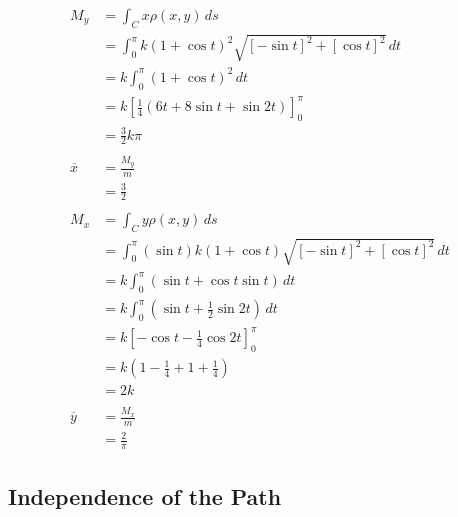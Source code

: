\documentclass{article}
\begin{document}
\setcounter{subsubsection}{40}
\subsubsection{}

\begin{align*}
  M_y          & = \int_C x \rho(x, y) \,ds                                                \\
               & = \int_0^\pi k (1 + \cos t)^2 \sqrt{[-\sin t]^2 + [\cos t]^2} \,dt        \\
               & = k \int_0^\pi (1 + \cos t)^2 \,dt                                        \\
               & = k \left[ \frac{1}{4} (6 t + 8 \sin t + \sin 2 t) \right]_0^\pi          \\
               & = \frac{3}{2} k \pi                                                       \\ \\
  \overline{x} & = \frac{M_y}{m}                                                           \\
               & = \frac{3}{2}                                                             \\ \\
  M_x          & = \int_C y \rho(x, y) \,ds                                                \\
               & = \int_0^\pi (\sin t) k (1 + \cos t) \sqrt{[-\sin t]^2 + [\cos t]^2} \,dt \\
               & = k \int_0^\pi (\sin t + \cos t \sin t) \,dt                              \\
               & = k \int_0^\pi \left( \sin t + \frac{1}{2} \sin 2 t \right) \,dt          \\
               & = k \left[ -\cos t - \frac{1}{4} \cos 2 t \right]_0^\pi                   \\
               & = k \left( 1 - \frac{1}{4} + 1 + \frac{1}{4} \right)                      \\
               & = 2 k                                                                     \\ \\
  \overline{y} & = \frac{M_x}{m}                                                           \\
               & = \frac{2}{\pi}
\end{align*}

\subsection{Independence of the Path}
\end{document}
